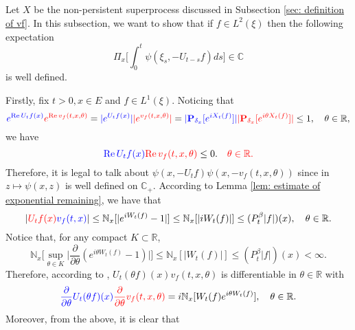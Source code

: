 \documentclass[12pt,oneside,english]{amsart}
\theoremstyle{plain}
\theoremstyle{definition}
\numberwithin{equation}{section}
\newcommand{\added}[1]{{\color{blue}#1}}\newcommand{\deleted}[1]{{\color{red}#1}}
\begin{document}
\subsection{}
\deleted{
    Let $X$ be the non-persistent superprocess discussed in Subsection \ref{sec: definition of vf}.
    In this subsection, we want to show that if $f\in L^2(\xi)$ then the following expectation
\[
    \Pi_x\Big[\int_0^t \psi(\xi_s,- U_{t-s}f)ds\Big]
    \in \mathbb C
\]
    is well defined.
}
    
    Firstly, fix $t > 0,x\in E$ and $f\in L^1(\xi)$.
    Noticing that
\[
    \added{ e^{\operatorname{Re} U_tf(x)}}
    \deleted{ e^{\operatorname{Re} v_f(t,x,\theta)}} 
    = \added{|e^{U_tf(x)}|}
    \deleted{ |e^{v_f(t,x,\theta)}|}
    = \added{|\mathbf P_{\delta_x}[e^{i X_t(f)}]|}
    \deleted{|\mathbf P_{\delta_x}[e^{i\theta X_t(f)}]|}
    \leq 1,
    \quad \theta\in \mathbb R,
\]
    we have
\begin{equation}
\label{eq: -v has positive real part}
    \added{ \operatorname{Re} U_tf(x)}
    \deleted{ \operatorname{Re} v_f(t,x,\theta)} 
    \leq 0.
    \deleted{\quad \theta \in \mathbb R.}
\end{equation}
    Therefore, it is legal to talk about \added{$\psi(x,-U_tf)$}\deleted{$\psi(x,-v_f(t,x,\theta))$} since \deleted{in} $z\mapsto \psi(x,z)$ is well defined on $\mathbb C_+$.
    According to Lemma \ref{lem: estimate of exponential remaining}, we have that
\begin{equation}
\label{eq: upper bound for vf}
    |\deleted{U_tf(x)}\added{ v_f(t,x)}| \leq \mathbb N_x[|e^{i W_t(f)} - 1|]
    \leq \mathbb N_x[|i W_t(f)|]
    \leq (P^\beta_t |f|)(x),
    \quad \theta \in \mathbb R.
\end{equation}
    Notice that, for any compact $K \subset \mathbb R$,
\begin{equation}
\label{eq: estimate of deriavetive of v(theta)}
    \mathbb N_x\Big[\sup_{\theta \in K} \Big|\frac{\partial}{\partial \theta} (e^{i\theta W_t(f)} - 1) \Big|\Big]
    \leq \mathbb N_x[|W_t(f)|] \leq (P^\beta_t |f|)(x) < \infty.
\end{equation}
    Therefore, according to \cite[Theorem A.5.2.]{Durrett2010Probability},
    \added{$U_t(\theta f)(x)$}\deleted{$v_f(t,x,\theta)$} is differentiable in $\theta \in \mathbb R$ with
\[
    \added{\frac{\partial}{\partial \theta} U_t(\theta f)(x)}
    \deleted{\frac{\partial}{\partial \theta} v_f(t,x,\theta)}
    = i\mathbb N_x[W_t(f)e^{i\theta W_t(f)}],
    \quad \theta \in \mathbb R.
\]
    Moreover, from the above, it is clear that
\end{document}
